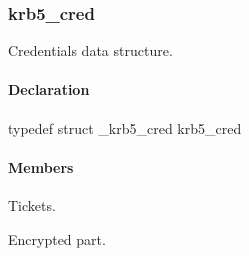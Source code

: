 \documentclass[letterpaper,10pt,english]{sphinxmanual}
\begin{document}
\subsubsection{krb5\_cred}
\label{appdev/refs/types/krb5_cred:krb5-cred-struct}\label{appdev/refs/types/krb5_cred::doc}\label{appdev/refs/types/krb5_cred:krb5-cred}

\begin{fulllineitems}
\label{appdev/refs/types/krb5_cred:krb5_cred}
\end{fulllineitems}


Credentials data structure.


\paragraph{Declaration}
\label{appdev/refs/types/krb5_cred:declaration}
typedef struct \_krb5\_cred  krb5\_cred


\paragraph{Members}
\label{appdev/refs/types/krb5_cred:members}

\begin{fulllineitems}
\label{appdev/refs/types/krb5_cred:krb5_cred.magic}
\end{fulllineitems}


\begin{fulllineitems}
\label{appdev/refs/types/krb5_cred:krb5_cred.tickets}
Tickets.

\end{fulllineitems}


\begin{fulllineitems}
\label{appdev/refs/types/krb5_cred:krb5_cred.enc_part}
Encrypted part.

\end{fulllineitems}
\end{document}
